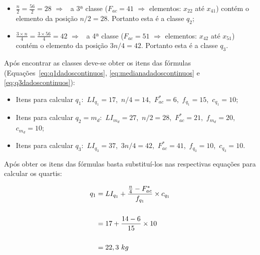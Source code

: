 \documentclass[11pt,fleqn]{book} %
\begin{document}
\begin{example}
\begin{itemize}
\item $\displaystyle \frac{n}{2}=\frac{56}{2}=28 \,\, \Rightarrow$ \, a 3ª classe ($F_{ac}=41$ $\Rightarrow$ elementos: $x_{22}$ até $x_{41}$) contém o elemento da posição $n/2=28$. Portanto esta é a classe $q_2$; \\

\item $\displaystyle \frac{3 \times n}{4}=\frac{3 \times 56}{4}=42 \,\, \Rightarrow$ \, a 4ª classe ($F_{ac}=51$ $\Rightarrow$ elementos: $x_{42}$ até $x_{51}$) contém o elemento da posição $3n/4=42$. Portanto esta é a classe $q_3$. \\

\end{itemize}


Após encontrar as classes deve-se obter os itens das fórmulas (Equações~\ref{eq:q1dadoscontinuos}, \ref{eq:medianadadoscontinuos} e \ref{eq:q3dadoscontinuos}): \\

\begin{itemize}
\item 	Itens para calcular $q_1$:\, $LI_{q_1}=17$,\,   $n/4=14$,\,   $F_{ac}^*=6$,\,  $f_{q_1}=15$,\,  $c_{q_1}=10$; \\
\item 	Itens para calcular $q_2=m_d$:\, $LI_{m_d}=27$,\,   $n/2=28$,\,   $F_{ac}^*=21$,\,  $f_{m_d}=20$,\,  $c_{m_d}=10$; \\
\item 	Itens para calcular $q_3$:\, $LI_{q_3}=37$,\,   $3n/4=42$,\,   $F_{ac}^*=41$,\,  $f_{q_3}=10$,\,  $c_{q_3}=10$. \\
\end{itemize}

Após obter os itens das fórmulas basta substituí-los nas respectivas equações para calcular os quartis: \\

\vspace{4cm}


\begin{ceqn}
\begin{align*}
\centering
q_1
&= \displaystyle LI_{q_1}+\frac{\frac{n}{4}-F_{ac}^*}{f_{q_1}} \times c_{q_1} \\ \\
&= \displaystyle 17+\frac{14-6}{15} \times 10 \\ \\
&= 22,3 \,\, kg\\ \\
\end{align*}
\end{ceqn}



\end{example}
\end{document}
